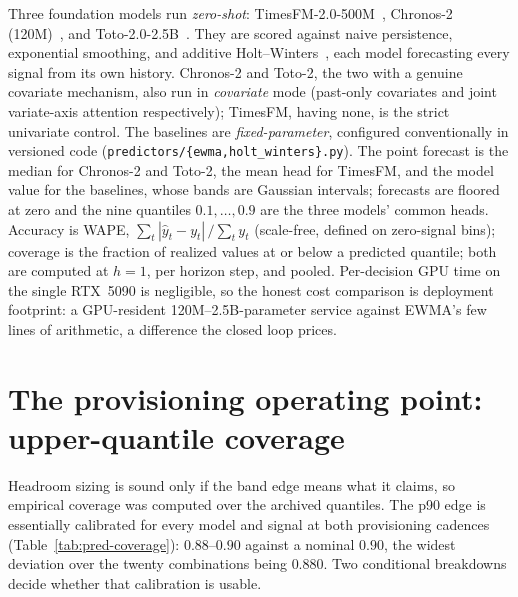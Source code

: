 Three foundation models run \emph{zero-shot}:
TimesFM-2.0-500M~\cite{Das2024TimesFM}, Chronos-2
(120M)~\cite{Ansari2025Chronos2}, and Toto-2.0-2.5B~\cite{Khwaja2026Toto2}.
They are scored against naive persistence, exponential smoothing, and
additive Holt--Winters~\cite{Hyndman2021fpp3}, each model forecasting every
signal from its own history. Chronos-2 and Toto-2, the two with a genuine
covariate mechanism, also run in \emph{covariate} mode (past-only covariates and
joint variate-axis attention respectively); TimesFM, having none, is the
strict univariate control. The baselines are \emph{fixed-parameter},
configured conventionally in versioned code
(\texttt{predictors/\{ewma,holt\_winters\}.py}). The point forecast is the
median for Chronos-2 and Toto-2, the mean head for TimesFM, and the model
value for the baselines, whose bands are Gaussian intervals; forecasts are
floored at zero and the nine quantiles $0.1,\ldots,0.9$ are the three
models' common heads. Accuracy is WAPE, $\sum_t |\hat y_t - y_t| \,/
\sum_t y_t$ (scale-free, defined on zero-signal bins); coverage is the
fraction of realized values at or below a predicted quantile; both are
computed at $h{=}1$, per horizon step, and pooled. Per-decision GPU time on
the single RTX~5090 is negligible, so the honest cost comparison is
deployment footprint: a GPU-resident 120M--2.5B-parameter service against
EWMA's few lines of arithmetic, a difference the closed loop prices.

\section[The provisioning operating point]{The provisioning operating
point: upper-quantile coverage}
\label{sec:pred-quantiles}

Headroom sizing is sound only if the band edge means what it claims, so
empirical coverage was computed over the archived quantiles. The p90 edge
is essentially calibrated for every model and signal at both provisioning
cadences (Table~\ref{tab:pred-coverage}): $0.88$--$0.90$ against a nominal
$0.90$, the widest deviation over the twenty combinations being $0.880$.
Two conditional breakdowns decide whether that calibration is usable.

